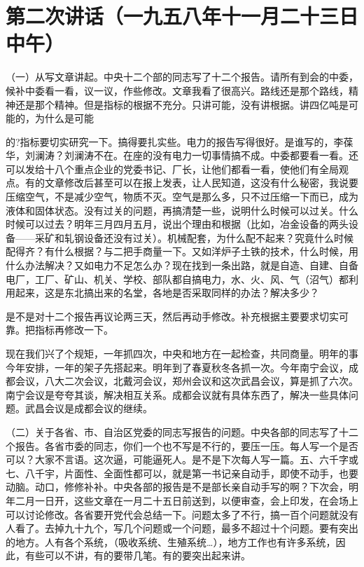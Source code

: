 \section[第二次讲话（一九五八年十一月二十三日中午）]{第二次讲话（一九五八年十一月二十三日中午）}


（一）从写文章讲起。中央十二个部的同志写了十二个报告。请所有到会的中委，候补中委看一看，议一议，作些修改。文章我看了很高兴。路线还是那个路线，精神还是那个精神。但是指标的根据不充分。只讲可能，没有讲根据。讲四亿吨是可能的，为什么是可能

的?指标要切实研究一下。搞得要扎实些。电力的报告写得很好。是谁写的，李葆华，刘澜涛？刘澜涛不在。在座的没有电力一切事情搞不成。中委都要看一看。还可以发给十八个重点企业的党委书记、厂长，让他们都看一看，使他们有全局观点。有的文章修改后甚至可以在报上发表，让人民知道，这没有什么秘密，我说要压缩空气，不是减少空气，物质不灭。空气是那么多，只不过压缩一下而已，成为液体和固体状态。没有过关的问题，再搞清楚一些，说明什么时候可以过关。什么时候可以过去？明年三月四月五月，说出个理由和根据（比如，冶金设备的两头设备——采矿和轧钢设备还没有过关）。机械配套，为什么配不起来？究竟什么时候配得齐？有什么根据？与二把手商量一下。又如洋炉子土铁的技术，什么时候，用什么办法解决？又如电力不足怎么办？现在找到一条出路，就是自造、自建、自备电厂，工厂、矿山、机关、学校、部队都自搞电力，水、火、风、气（沼气）都利用起来，这是东北搞出来的名堂，各地是否采取同样的办法？解决多少？

是不是对十二个报告再议论两三天，然后再动手修改。补充根据主要要求切实可靠。把指标再修改一下。

现在我们兴了个规矩，一年抓四次，中央和地方在一起检查，共同商量。明年的事今年安排，一年的架子先搭起来。明年到了春夏秋冬各抓一次。今年南宁会议，成都会议，八大二次会议，北戴河会议，郑州会议和这次武昌会议，算是抓了六次。南宁会议是夸夸其谈，解决相互关系。成都会议就有具体东西了，解决一些具体问题。武昌会议是成都会议的继续。

（二）关于各省、市、自治区党委的同志写报告的问题。中央各部的同志写了十二个报告。各省市委的同志，你们一个也不写是不行的，要压一压。每人写一个是否可以？大家不言语。这次逼，可能逼死人。是不是下次每人写一篇。五、六千字或七、八千宇，片面性、全面性都可以，就是第一书记亲自动手，即使不动手，也要动脑。动口，修修补补。中央各部的报告是不是部长亲自动手写的啊？下次会，明年二月一日开，这些文章在一月二十五日前送到，以便审查，会上印发，在会场上可以讨论修改。各省要开党代会总结一下。问题太多了不行，搞一百个问题就没有人看了。去掉九十九个，写几个问题或一个问题，最多不超过十个问题。要有突出的地方。人有各个系统，（吸收系统、生殖系统…），地方工作也有许多系统，因此，有些可以不讲，有的要带几笔。有的要突出起来讲。

